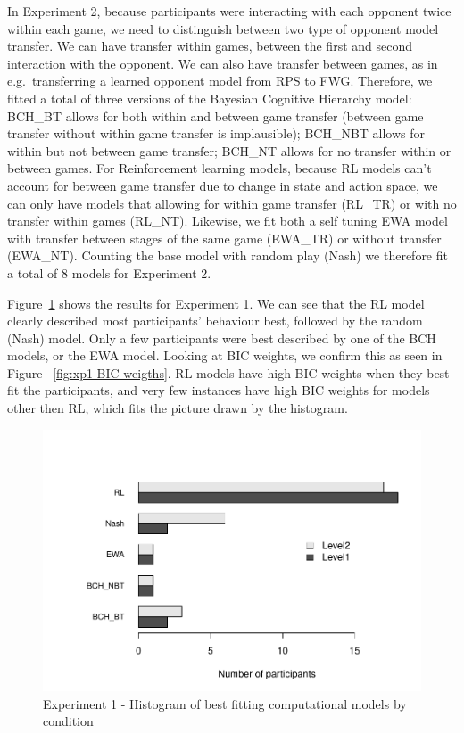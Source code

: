\documentclass[man,floatsintext]{apa6}
\begin{document}
In Experiment 2, because participants were interacting with each opponent twice within each game, we need to distinguish between two type of opponent model transfer. We can have transfer within games, between the first and second interaction with the opponent. We can also have transfer between games, as in e.g.~transferring a learned opponent model from RPS to FWG. Therefore, we fitted a total of three versions of the Bayesian Cognitive Hierarchy model: BCH\_BT allows for both within and between game transfer (between game transfer without within game transfer is implausible); BCH\_NBT allows for within but not between game transfer; BCH\_NT allows for no transfer within or between games. For Reinforcement learning models, because RL models can't account for between game transfer due to change in state and action space, we can only have models that allowing for within game transfer (RL\_TR) or with no transfer within games (RL\_NT). Likewise, we fit both a self tuning EWA model with transfer between stages of the same game (EWA\_TR) or without transfer (EWA\_NT). Counting the base model with random play (Nash) we therefore fit a total of 8 models for Experiment 2.

Figure~\ref{fig:exp1-comp-models} shows the results for Experiment 1. We can see that the RL model clearly described most participants' behaviour best, followed by the random (Nash) model. Only a few participants were best described by one of the BCH models, or the EWA model. Looking at BIC weights, we confirm this as seen in Figure ~\ref{fig:xp1-BIC-weigths}. RL models have high BIC weights when they best fit the participants, and very few instances have high BIC weights for models other then RL, which fits the picture drawn by the histogram.

\begin{figure}

{\centering \includegraphics[width=\textwidth]{paper_draft_2021_files/figure-latex/exp1-comp-models-1} 

}

\caption{Experiment 1 - Histogram of best fitting computational models by condition}\label{fig:exp1-comp-models}
\end{figure}
\end{document}
